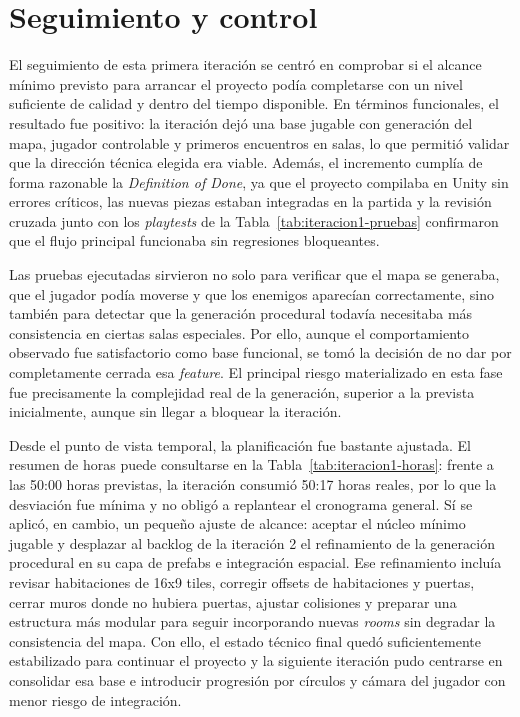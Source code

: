 \section{Seguimiento y control}
El seguimiento de esta primera iteración se centró en comprobar si el alcance mínimo previsto
para arrancar el proyecto podía completarse con un nivel suficiente de calidad y dentro del
tiempo disponible. En términos funcionales, el resultado fue positivo: la iteración dejó una
base jugable con generación del mapa, jugador controlable y primeros encuentros en salas, lo
que permitió validar que la dirección técnica elegida era viable. Además, el incremento
cumplía de forma razonable la \textit{Definition of Done}, ya que el proyecto compilaba en
Unity sin errores críticos, las nuevas piezas estaban integradas en la partida y la revisión
cruzada junto con los \textit{playtests} de la Tabla~\ref{tab:iteracion1-pruebas} confirmaron
que el flujo principal funcionaba sin regresiones bloqueantes.

Las pruebas ejecutadas sirvieron no solo para verificar que el mapa se generaba, que el
jugador podía moverse y que los enemigos aparecían correctamente, sino también para detectar
que la generación procedural todavía necesitaba más consistencia en ciertas salas especiales.
Por ello, aunque el comportamiento observado fue satisfactorio como base funcional, se tomó la
decisión de no dar por completamente cerrada esa \textit{feature}. El principal riesgo
materializado en esta fase fue precisamente la complejidad real de la generación, superior a
la prevista inicialmente, aunque sin llegar a bloquear la iteración.

Desde el punto de vista temporal, la planificación fue bastante ajustada. El resumen de horas
puede consultarse en la Tabla~\ref{tab:iteracion1-horas}: frente a las 50:00 horas previstas,
la iteración consumió 50:17 horas reales, por lo que la desviación fue mínima y no obligó a
replantear el cronograma general. Sí se aplicó, en cambio, un pequeño ajuste de alcance:
aceptar el núcleo mínimo jugable y desplazar al backlog de la iteración 2 el refinamiento de
la generación procedural en su capa de prefabs e integración espacial. Ese refinamiento
incluía revisar habitaciones de 16x9 tiles, corregir offsets de habitaciones y puertas,
cerrar muros donde no hubiera puertas, ajustar colisiones y preparar una estructura más
modular para seguir incorporando nuevas \textit{rooms} sin degradar la consistencia del mapa.
Con ello, el estado técnico final quedó suficientemente estabilizado para continuar el
proyecto y la siguiente iteración pudo centrarse en consolidar esa base e introducir
progresión por círculos y cámara del jugador con menor riesgo de integración.


